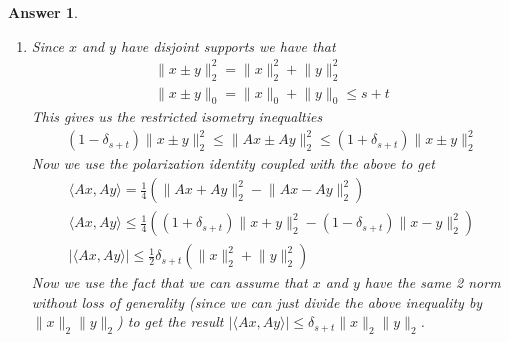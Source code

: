 \documentclass[12pt]{article}
\theoremstyle{colon}
\newtheorem*{answer}{Answer}
\begin{document}
\begin{answer}
  \leavevmode
  \begin{enumerate}[label=\arabic*)]
    \item Since $x$ and $y$ have disjoint supports we have that
      \begin{gather*}
        \lVert x \pm y \rVert_2^2 = \lVert x \rVert_2^2 + \lVert y \rVert_2^2 \\
        \lVert x \pm y \rVert_0 = \lVert x \rVert_0 + \lVert y \rVert_0 \leq s + t
      \end{gather*}
      This gives us the restricted isometry inequalties
      \begin{gather*}
        (1-\delta_{s+t})\lVert x \pm y \rVert_2^2 \leq \lVert Ax \pm Ay \rVert_2^2 \leq (1+\delta_{s+t})\lVert x \pm y \rVert_2^2
      \end{gather*}
      Now we use the polarization identity coupled with the above to get
      \begin{gather*}
        \langle Ax, Ay \rangle = \frac{1}{4} (\lVert Ax + Ay \rVert_2^2 - \lVert Ax - Ay \rVert_2^2) \\
        \langle Ax, Ay \rangle \leq \frac{1}{4} ((1+\delta_{s+t})\lVert x + y \rVert_2^2 - (1-\delta_{s+t})\lVert x - y \rVert_2^2) \\
        \lvert \langle Ax, Ay \rangle \rvert \leq \frac{1}{2} \delta_{s+t} (\lVert x \rVert_2^2 + \lVert y \rVert_2^2)
      \end{gather*}
      Now we use the fact that we can assume that $x$ and $y$ have the same 2 norm without loss of generality (since we can just divide the above inequality by $\lVert x \rVert_2 \lVert y \rVert_2$) to get the result $\lvert \langle Ax, Ay \rangle \rvert \leq \delta_{s+t} \lVert x \rVert_2 \lVert y \rVert_2$.


\end{enumerate}
\end{answer}
\end{document}
